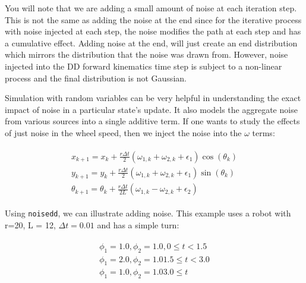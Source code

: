 You will note that we are adding a small amount of noise at each
iteration step. This is not the same as adding the noise at the end
since for the iterative process with noise injected at each step, the
noise modifies the path at each step and has a cumulative effect. Adding
noise at the end, will just create an end distribution which mirrors the
distribution that the noise was drawn from. However, noise injected into
the DD forward kinematics time step is subject to a non-linear process
and the final distribution is not Gaussian.

Simulation with random variables can be very helpful in understanding
the exact impact of noise in a particular state's update. It also models
the aggregate noise from various sources into a single additive term. If
one wants to study the effects of just noise in the wheel speed, then we
inject the noise into the \(\omega\) terms:

\[\begin{aligned}
\begin{array}{l}
 x_{k+1} = x_k + \frac{r\Delta t}{2} (\omega_{1, k}+\omega_{2, k} + \epsilon_1)\cos(\theta_k)\\[2mm]
y_{k+1} = y_k + \frac{r\Delta t}{2} (\omega_{1, k}+\omega_{2, k}  + \epsilon_1)\sin(\theta_k)\\[2mm]
\theta_{k+1} = \theta_k + \frac{r\Delta t}{2L} (\omega_{1, k}-\omega_{2, k} + \epsilon_2)
\end{array}
\end{aligned}\]

Using \texttt{noisedd}, we can illustrate adding noise. This example
uses a robot with r=20, L = 12, \(\Delta t = 0.01\) and has a simple
turn:

\[\begin{aligned}
\begin{array}{l}
\phi_1 = 1.0, \phi_2 = 1.0,   0 \leq t < 1.5 \\
\phi_1 = 2.0, \phi_2 = 1.0    1.5 \leq t < 3.0 \\
\phi_1 = 1.0, \phi_2 = 1.0    3.0 \leq t
\end{array}
\end{aligned}\]

